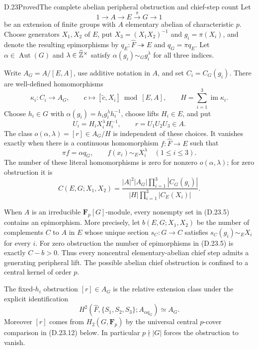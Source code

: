 \begin{statement}{D.23}{Proved}{The complete abelian peripheral obstruction and chief-step count}
Let
\[
 1\longrightarrow A\longrightarrow E\xrightarrow{\pi}G
 \longrightarrow1
 \tag{D.23.2}
\]
be an extension of finite groups with $A$ elementary abelian of
characteristic $p$.  Choose generators $X_1,X_2$ of $E$, put
$X_3=(X_1X_2)^{-1}$ and $g_i=\pi(X_i)$, and denote the resulting
epimorphisms by $q_E:\widehat F\twoheadrightarrow E$ and
$q_G=\pi q_E$.  Let $\alpha\in\operatorname{Aut}(G)$ and
$\lambda\in\widehat{\mathbb Z}^\times$ satisfy
$\alpha(g_i)\sim_G g_i^\lambda$ for all three indices.

Write $A_G=A/[E,A]$, use additive notation in $A$, and set
$C_i=C_G(g_i)$.  There are well-defined homomorphisms
\[
 \kappa_i:C_i\longrightarrow A_G,
 \qquad c\longmapsto[\widetilde c,X_i]\bmod[E,A],
 \qquad H=\sum_{i=1}^3\operatorname{im}\kappa_i.
 \tag{D.23.3}
\]
Choose $h_i\in G$ with
$\alpha(g_i)=h_i g_i^\lambda h_i^{-1}$, choose lifts
$H_i\in E$, and put
\[
 U_i=H_iX_i^\lambda H_i^{-1},\qquad r=U_1U_2U_3\in A.
 \tag{D.23.4}
\]
The class $o(\alpha,\lambda)=[r]\in A_G/H$ is independent of
these choices.  It vanishes exactly when there is a continuous
homomorphism $f:\widehat F\to E$ such that
\[
 \pi f=\alpha q_G,
 \qquad f(x_i)\sim_E X_i^\lambda\quad(1\leq i\leq3).
 \tag{D.23.5}
\]
The number of these literal homomorphisms is zero for nonzero
$o(\alpha,\lambda)$; for zero obstruction it is
\[
 C(E,G;X_1,X_2)=
 \frac{|A|^2|A_G|\prod_{i=1}^3|C_G(g_i)|}
 {|H|\prod_{i=1}^3|C_E(X_i)|}.
 \tag{D.23.6}
\]

When $A$ is an irreducible $\mathbf F_p[G]$-module, every nonempty
set in \textup{(D.23.5)} contains an epimorphism.  More precisely, let
$b(E,G;X_1,X_2)$ be the number of complements $C$ to $A$ in $E$
whose unique section $s_C:G\to C$ satisfies
$s_C(g_i)\sim_E X_i$ for every $i$.  For zero obstruction the number
of epimorphisms in \textup{(D.23.5)} is exactly $C-b>0$.
Thus every noncentral elementary-abelian chief step admits a
generating peripheral lift.  The possible abelian chief obstruction
is confined to a central kernel of order $p$.

The fixed-$h_i$ obstruction $[r]\in A_G$ is the relative extension
class under the explicit identification
\[
 H^2(\widehat F,\{S_1,S_2,S_3\};A_{\alpha q_G})
 \simeq A_G.
 \tag{D.23.7}
\]
Moreover $[r]$ comes from $H_2(G,\mathbf F_p)$ by the universal
central $p$-cover comparison in \textup{(D.23.12)} below.  In
particular $p\nmid|G|$ forces the obstruction to vanish.
\end{statement}

